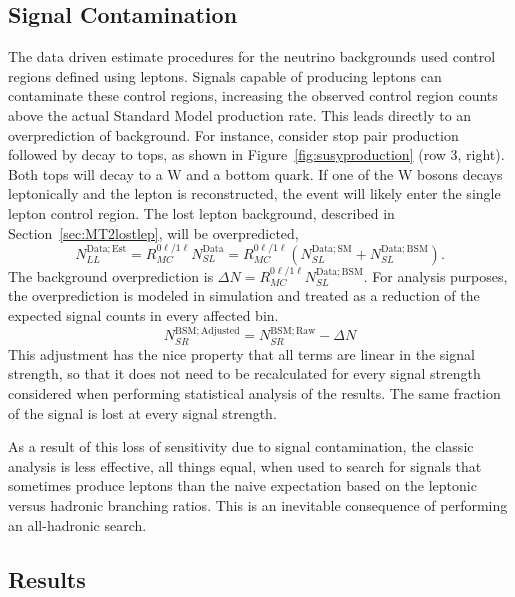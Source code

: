   \subsection{Signal Contamination} \label{sec:MT2sigcontam}

  The data driven estimate procedures for the neutrino backgrounds used control regions defined using leptons.
  Signals capable of producing leptons can contaminate these control regions, increasing the observed control region counts above the actual Standard Model production rate.
  This leads directly to an overprediction of background.
  For instance, consider stop pair production followed by decay to tops, as shown in Figure~\ref{fig:susyproduction} (row 3, right).
  Both tops will decay to a W and a bottom quark.
  If one of the W bosons decays leptonically and the lepton is reconstructed, the event will likely enter the single lepton control region.
  The lost lepton background, described in Section~\ref{sec:MT2lostlep}, will be overpredicted,
  \begin{equation}
    N_{LL}^{\mathrm{Data;Est}} = R_{MC}^{0\ell/1\ell} N_{SL}^{\mathrm{Data}} = R_{MC}^{0\ell/1\ell} \left(N_{SL}^{\mathrm{Data;SM}} + N_{SL}^{\mathrm{Data;BSM}}\right).
  \end{equation}
  The background overprediction is $\Delta N = R_{MC}^{0\ell/1\ell}N_{SL}^{\mathrm{Data;BSM}}$.
  For analysis purposes, the overprediction is modeled in simulation and treated as a reduction of the expected signal counts in every affected bin.
  \begin{equation}
    N_{SR}^{\mathrm{BSM;Adjusted}} = N_{SR}^{\mathrm{BSM;Raw}} - \Delta N
  \end{equation}
  This adjustment has the nice property that all terms are linear in the signal strength, so that it does not need to be recalculated for every signal strength considered when performing statistical analysis of the results.
  The same fraction of the signal is lost at every signal strength.
  
  As a result of this loss of sensitivity due to signal contamination, the classic analysis is less effective, all things equal, when used to search for signals that sometimes produce leptons than the naive expectation based on the leptonic versus hadronic branching ratios.
  This is an inevitable consequence of performing an all-hadronic search.

  \subsection{Results} \label{sec:MT2results}

